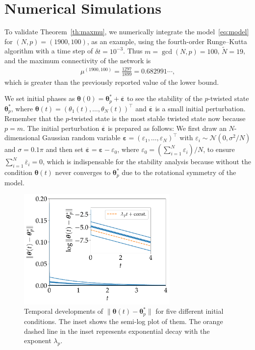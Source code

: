 \section{Numerical Simulations}
\label{sec:numeric}
To validate Theorem~\ref{th:maxmu}, we numerically integrate the model~\eqref{eq:model} for $(N,p)=(1900,100)$, as an example, using the fourth-order Runge--Kutta algorithm with a time step of $\delta t=10^{-3}$. Thus $m=\gcd(N, p)=100$, $\widetilde{N}=19$, and the maximum connectivity of the network is
\begin{align}
    \mu^{(1900,100)}=\frac{1297}{1899}=0.682991\cdots,
\end{align}
which is greater than the previously reported value of the lower bound.

We set initial phases as $\bm{\theta}(0)=\bm{\theta}_{p}^{\ast}+\overline{\bm{\varepsilon}}$ to see the stability of the $p$-twisted state $\bm{\theta}_{p}^{\ast}$, where $\bm{\theta}(t)=(\theta_{1}(t),\dots,\theta_{N}(t))^{\top}$ and $\overline{\bm{\varepsilon}}$ is a small initial perturbation. Remember that the $p$-twisted state is the most stable twisted state now because $p=m$. The initial perturbation $\overline{\bm{\varepsilon}}$ is prepared as follows: We first draw an $N$-dimensional Gaussian random variable $\bm{\varepsilon}=(\varepsilon_{1},\dots,\varepsilon_{N})^{\top}$ with $\varepsilon_{i}\sim\mathcal{N}(0,\sigma^{2}/N)$ and $\sigma=0.1\pi$ and then set $\overline{\bm{\varepsilon}}=\bm{\varepsilon}-\varepsilon_{0}$, where $\varepsilon_{0}=(\sum_{i=1}^{N}\varepsilon_{i})/N$, to ensure $\sum_{i=1}^{N}\overline{\varepsilon}_{i}=0$, which is indispensable for the stability analysis because without the condition $\bm{\theta}(t)$ never converges to $\bm{\theta}_{p}^{\ast}$ due to the rotational symmetry of the model.

\begin{figure}[!t]
    \centering
    \includegraphics[width=0.7\textwidth]{figs/ode.pdf}
    \caption{
        Temporal developments of $\|\bm{\theta}(t)-\bm{\theta}^{\ast}_{p}\|$ for five different initial conditions. The inset shows the semi-log plot of them. The orange dashed line in the inset represents exponential decay with the exponent $\lambda_{p}$.
    }
    \label{fig:ode}
\end{figure}


